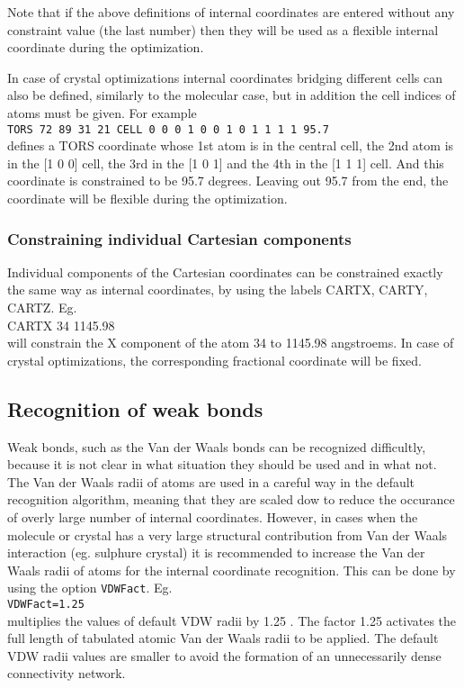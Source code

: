 \documentclass[prl,aps,preprint,superbib,12pt]{revtex4}
\begin{document}
Note that if the above definitions of internal coordinates are entered
without any constraint value (the last number) then they will be used as 
a flexible internal coordinate during the optimization.

In case of crystal optimizations internal coordinates bridging different
cells can also be defined, similarly to the molecular case, but
in addition the cell indices of atoms must be given.
For example
\\
{\tt TORS 72 89 31 21 CELL 0 0 0  1 0 0  1 0 1  1 1 1  95.7}
\\
defines a TORS coordinate whose 1st atom is in the central cell,
the 2nd atom is in the [1 0 0] cell, the 3rd in the [1 0 1] and
the 4th in the [1 1 1] cell. And this coordinate is constrained to
be 95.7 degrees. Leaving out 95.7 from the end, the coordinate will be
flexible during the optimization.

\subsubsection{Constraining individual Cartesian components}
Individual components of the Cartesian coordinates can be constrained 
exactly the same way as internal coordinates, by using the labels
CARTX, CARTY, CARTZ. Eg.
\\
CARTX 34 1145.98
\\
will constrain the X component of the atom 34 to 1145.98 angstroems.
In case of crystal optimizations, the corresponding fractional
coordinate will be fixed.

\subsection{Recognition of weak bonds}
Weak bonds, such as the Van der Waals bonds can be recognized difficultly,
because it is not clear in what situation they should be used and in what 
not.
The Van der Waals radii of atoms are used in a careful way in the default 
recognition algorithm, meaning that they are scaled dow to reduce the occurance
of overly large number of internal coordinates.
However, in cases when the molecule or crystal has a very large structural
contribution from Van der Waals interaction (eg. sulphure crystal) it is recommended to increase the Van der Waals radii of atoms for the internal coordinate 
recognition. This can be done by using the option {\tt VDWFact}.
Eg. 
\\
{\tt VDWFact=1.25}
\\ 
multiplies the values of default VDW radii by 1.25 . The factor 1.25 activates 
the full length of tabulated atomic Van der Waals radii to be applied.
The default VDW radii values are smaller to avoid the formation of an unnecessarily dense connectivity network.
\end{document}
